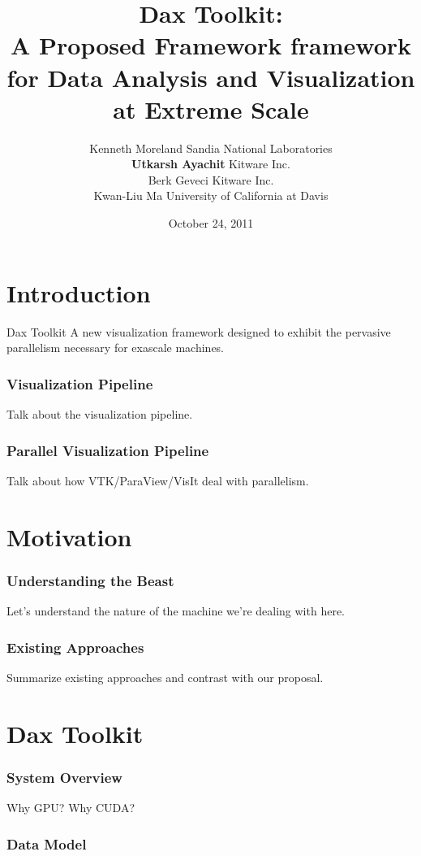 \documentclass{beamer}
\title{\textbf{Dax Toolkit}: \\
  A Proposed Framework framework for Data Analysis and Visualization \\
  at Extreme Scale}
\author{\small
  Kenneth Moreland {\tiny Sandia National Laboratories} \\
  \textbf{Utkarsh Ayachit} {\tiny Kitware Inc. } \\
  Berk Geveci {\tiny Kitware Inc. }\\
  Kwan-Liu Ma {\tiny University of California at Davis}
}
\date {October 24, 2011}
\begin{document}
\frame{\titlepage}

\section{Introduction}

\frame
{
  \begin{beamerboxesrounded}{Dax Toolkit}
  A new visualization framework designed to exhibit the pervasive parallelism
    necessary for exascale machines.
  \end{beamerboxesrounded}
}

\frame
{
  \frametitle{Visualization Pipeline}
  Talk about the visualization pipeline.
}

\frame
{
  \frametitle{Parallel Visualization Pipeline}
  Talk about how VTK/ParaView/VisIt deal with parallelism.
}

\section{Motivation}

\frame
{
  \frametitle{Understanding the Beast}
  Let's understand the nature of the machine we're dealing with here.
}

\frame
{
  \frametitle{Existing Approaches}
  Summarize existing approaches and contrast with our proposal.
}

\section{Dax Toolkit}

\frame
{
  \frametitle{System Overview}
  Why GPU? Why CUDA?
}

\frame
{
  \frametitle{Data Model}
}
\end{document}
